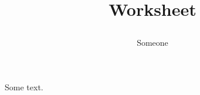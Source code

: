\documentclass{exam}
\title{

{\begin{flushright}\bfseries Worksheet\end{flushright}}}
\author{Someone}
\begin{document}
\maketitle
Some text.
\end{document}
